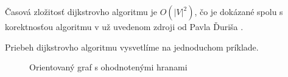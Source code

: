 Časová zložitosť dijkstrovho algoritmu je $O(|V|^{2})$, čo je dokázané spolu s korektnosťou algoritmu v už uvedenom zdroji od Pavla Ďuriša \cite[kapitola 2.2.1]{duris2009}.\newline

Priebeh dijkstrovho algoritmu vysvetlíme na jednoduchom príklade.

\begin{figure}[H]
  \caption{Orientovaný graf s ohodnotenými hranami}
  \label{dijkstra_priklad}
\end{figure}


